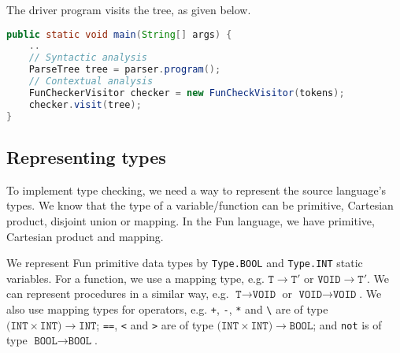 \documentclass[a4paper, openany]{memoir}
\begin{document}
The driver program visits the tree, as given below.
\begin{lstlisting}[language=java]
public static void main(String[] args) {
    ..
    // Syntactic analysis 
    ParseTree tree = parser.program();
    // Contextual analysis
    FunCheckerVisitor checker = new FunCheckVisitor(tokens);
    checker.visit(tree);
}
\end{lstlisting}

\subsection{Representing types}
To implement type checking, we need a way to represent the source language's types. We know that the type of a variable/function can be primitive, Cartesian product, disjoint union or mapping. In the Fun language, we have primitive, Cartesian product and mapping.

We represent Fun primitive data types by \texttt{Type.BOOL} and \texttt{Type.INT} static variables. For a function, we use a mapping type, e.g. $\texttt{T} \to \texttt{T}'$ or $\texttt{VOID} \to \texttt{T}'$. We can represent procedures in a similar way, e.g. $\texttt{T} \to \texttt{VOID}$ or $\texttt{VOID} \to \texttt{VOID}$. We also use mapping types for operators, e.g. \texttt{+}, \texttt{-}, \texttt{*} and \texttt{\textbackslash} are of type $\texttt{(INT} \times \texttt{INT)} \to \texttt{INT}$; \texttt{==}, \texttt{<} and \texttt{>} are of type $(\texttt{INT} \times \texttt{INT)} \to \texttt{BOOL}$; and \texttt{not} is of type $\texttt{BOOL} \to \texttt{BOOL}$.
\end{document}
